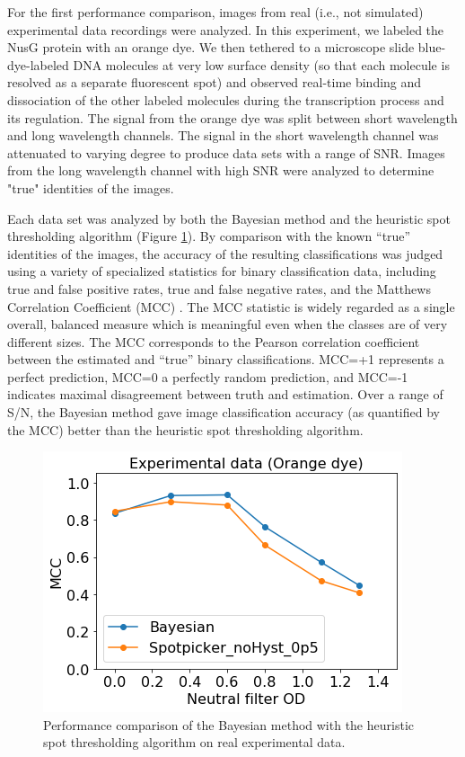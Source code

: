 For the first performance comparison, images from real (i.e., not simulated) experimental data recordings were analyzed. In this experiment, we labeled the NusG protein with an orange dye. We then tethered to a microscope slide blue-dye-labeled DNA molecules at very low surface density (so that each molecule is resolved as a separate fluorescent spot) and observed real-time binding and dissociation of the other labeled molecules during the transcription process and its regulation. The signal from the orange dye was split between short wavelength and long wavelength channels. The signal in the short wavelength channel was attenuated to varying degree to produce data sets with a range of SNR. Images from the long wavelength channel with high SNR were analyzed to determine "true" identities of the images.

Each data set was analyzed by both the Bayesian method and the heuristic spot thresholding algorithm (Figure \ref{fig:real_data}). By comparison with the known “true” identities of the images, the accuracy of the resulting classifications was judged using a variety of specialized statistics for binary classification data, including true and false positive rates, true and false negative rates, and the Matthews Correlation Coefficient (MCC) \citep{Fawcett2006-bq, Matthews1975-rw}. The MCC statistic is widely regarded as a single overall, balanced measure which is meaningful even when the classes are of very different sizes. The MCC corresponds to the Pearson correlation coefficient between the estimated and “true” binary classifications. MCC=+1 represents a perfect prediction, MCC=0 a perfectly random prediction, and MCC=-1 indicates maximal disagreement between truth and estimation. Over a range of S/N, the Bayesian method gave image classification accuracy (as quantified by the MCC) better than the heuristic spot thresholding algorithm. 

\begin{figure}
\includegraphics[width=\linewidth]{figures/figure4.png}
\caption{Performance comparison of the Bayesian method with the heuristic spot thresholding algorithm on real experimental data.}
\label{fig:real_data}
\end{figure}

